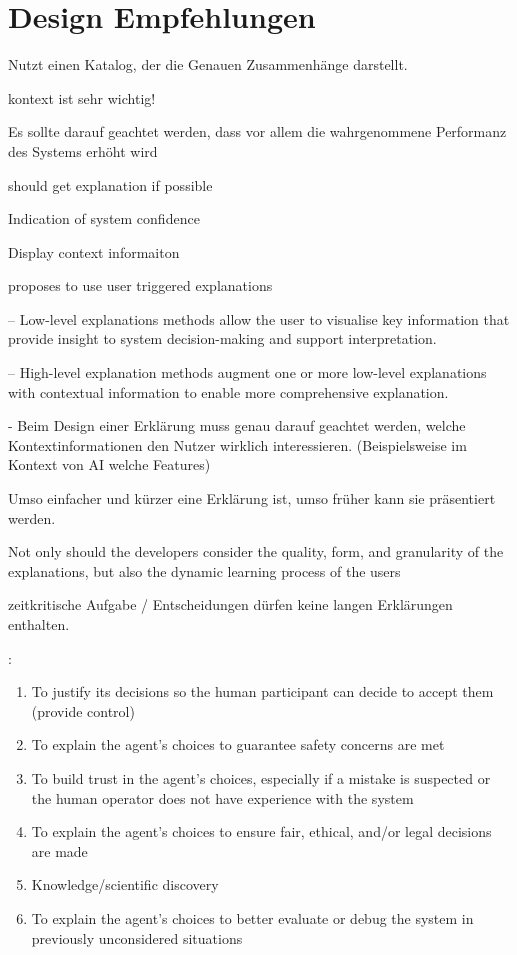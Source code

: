 \section{Design Empfehlungen}
\label{sec:model_design_implications}

\cite{carvalho2020developers} Nutzt einen Katalog, der die Genauen Zusammenhänge darstellt.

kontext ist sehr wichtig! \cite{sato_context_nodate}

Es sollte darauf geachtet werden, dass vor allem die wahrgenommene Performanz des Systems erhöht wird \cite{riveiro_thats_2021}

should get explanation if possible \cite{wiegand_id_2020}

Indication of system confidence \cite{wiegand_id_2020, golledge1999wayfinding}

Display context informaiton \cite{wiegand_id_2020}

\cite{weitz_you_2019} proposes to use user triggered explanations

– Low-level explanations methods allow the user to visualise key information that provide insight to system decision-making and support interpretation. \cite{martin_evaluating_2021}

– High-level explanation methods augment one or more low-level explanations with contextual information to enable more comprehensive explanation. \cite{martin_evaluating_2021}

- Beim Design einer Erklärung muss genau darauf geachtet werden, welche Kontextinformationen den Nutzer wirklich interessieren. (Beispielsweise im Kontext von AI welche Features) \cite{rjoob_towards_2021}

Umso einfacher und kürzer eine Erklärung ist, umso früher kann sie präsentiert werden. \cite{hleg2019policy, sovrano_modelling_2020}

\glqq Not only should the developers consider the quality, form, and granularity of the explanations, but also the dynamic learning process of the users \grqq{} \cite{wang_integration_2020}

\cite{wiegand_id_2020, wiegand2019drive} zeitkritische Aufgabe / Entscheidungen dürfen keine langen Erklärungen enthalten.


\cite{rosenfeld_explainability_2019}:

\begin{enumerate}
    \item To justify its decisions so the human participant can decide to accept them (provide control)
    \item To explain the agent’s choices to guarantee safety concerns are met
    \item To build trust in the agent’s choices, especially if a mistake is suspected or the human operator does not have experience with the system
    \item To explain the agent’s choices to ensure fair, ethical, and/or legal decisions are made
    \item Knowledge/scientific discovery
    \item To explain the agent’s choices to better evaluate or debug the system in previously unconsidered situations
\end{enumerate}